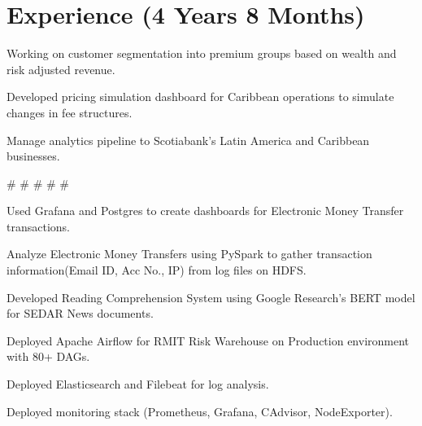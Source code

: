 \documentclass[]{Vishnu-Resume}
\begin{document}
\hfill
\begin{minipage}[t]{0.66\textwidth} 


\section{Experience (4 Years 8 Months)}
\descript{}
\sectionsep
\sectionsep
\sectionsep
\sectionsep
\sectionsep
\sectionsep
\sectionsep
\sectionsep
\sectionsep
\sectionsep
\sectionsep
\sectionsep
\sectionsep
\sectionsep
\sectionsep
\begin{tightemize}
\item Working on customer segmentation into premium groups based on wealth and risk adjusted revenue.
\item Developed pricing simulation dashboard for Caribbean operations to simulate changes in fee structures.
\item Manage analytics pipeline to Scotiabank's Latin America and Caribbean businesses.
\end{tightemize}
\#  \#  \# \#  \#
\sectionsep

\begin{tightemize}
\item Used Grafana and Postgres to create dashboards for Electronic Money Transfer transactions.
\item Analyze Electronic Money Transfers using PySpark to gather transaction information(Email ID, Acc No., IP) from log files on HDFS.
\item Developed Reading Comprehension System using Google Research's BERT model for SEDAR News documents.
\end{tightemize}
\sectionsep

\begin{tightemize}
\item Deployed Apache Airflow for RMIT Risk Warehouse on Production environment with 80+ DAGs.
\item Deployed Elasticsearch and Filebeat for log analysis.
\item Deployed monitoring stack (Prometheus, Grafana, CAdvisor, NodeExporter).
\end{tightemize}
\sectionsep


\end{minipage}
\end{document}
